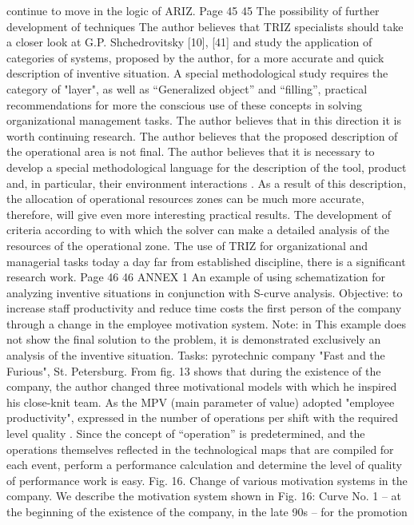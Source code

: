 continue to move in the logic of ARIZ.
Page 45
45
The possibility of further development of techniques
The author believes that TRIZ specialists should take a closer look at
G.P. Shchedrovitsky [10], [41] and study the application of categories of systems,
proposed by the author, for a more accurate and quick description of inventive
situation.
A special methodological study requires the category of "layer", as well as
“Generalized object” and “filling”, practical recommendations for more
the conscious use of these concepts in solving organizational
management tasks. The author believes that in this direction it is worth continuing
research.
The author believes that the proposed description of the operational area is not
final. The author believes that it is necessary to develop a special
methodological language for the description of the tool, product and, in particular, their environment
interactions . As a result of this description, the allocation of operational resources
zones can be much more accurate, therefore, will give even more interesting
practical results.
The development of criteria according to
with which the solver can make a detailed analysis of the resources of the operational zone.
The use of TRIZ for organizational and managerial tasks today
a day far from established discipline, there is a significant
research work.
Page 46
46
ANNEX 1
An example of using schematization for analyzing inventive
situations in conjunction with S-curve analysis.
Objective: to increase staff productivity and reduce time costs
the first person of the company through a change in the employee motivation system. Note: in
This example does not show the final solution to the problem, it is demonstrated
exclusively an analysis of the inventive situation.
Tasks: pyrotechnic company "Fast and the Furious", St. Petersburg.
From fig. 13 shows that during the existence of the company, the author changed three
motivational models with which he inspired his close-knit team.
As the MPV (main parameter of value) adopted "employee productivity",
expressed in the number of operations per shift with the required level
quality . Since the concept of “operation” is predetermined, and the operations themselves
reflected in the technological maps that are compiled for each event,
perform a performance calculation and determine the level of quality of performance
work is easy.
Fig. 16. Change of various motivation systems in the company.
We describe the motivation system shown in Fig. 16:
Curve No. 1 -- at the beginning of the existence of the company, in the late 90s -- for the promotion
